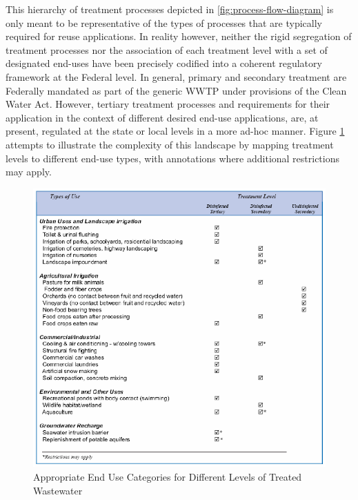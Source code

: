 This hierarchy of treatment processes depicted in \ref{fig:process-flow-diagram} is only meant to be representative of the types of processes that are typically required for reuse applications. In reality however, neither the rigid segregation of treatment processes nor the association of each treatment level with a set of designated end-uses have been precisely codified into a coherent regulatory framework at the Federal level. In general, primary and secondary treatment are Federally mandated as part of the generic WWTP under provisions of the Clean Water Act. However, tertiary treatment processes and requirements for their application in the context of different desired end-use applications, are, at present, regulated at the state or local levels in a more ad-hoc manner. Figure \ref{fig:use-categories} attempts to illustrate the complexity of this landscape by mapping treatment levels to different end-use types, with annotations where additional restrictions may apply.

     \begin{figure}[!h]
       \centering
       \includegraphics[width=5.5in]{figures/use-categories.png}
       \caption[Appropriate End Use Categories for Different Levels of Treated Wastewater]{Appropriate End Use Categories for Different Levels of Treated Wastewater \cite{Klein2005}}
       \label{fig:use-categories}
     \end{figure}
     
